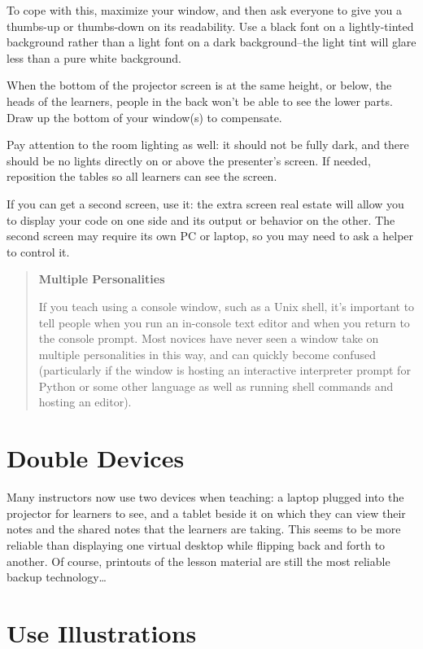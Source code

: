 \documentclass[10pt,statementpaper]{memoir}
\begin{document}
To cope with this, maximize your window, and then ask everyone to give
you a thumbs-up or thumbs-down on its readability. Use a black font on a
lightly-tinted background rather than a light font on a dark
background--the light tint will glare less than a pure white background.

When the bottom of the projector screen is at the same height, or below,
the heads of the learners, people in the back won't be able to see the
lower parts. Draw up the bottom of your window(s) to compensate.

Pay attention to the room lighting as well: it should not be fully dark,
and there should be no lights directly on or above the presenter's
screen. If needed, reposition the tables so all learners can see the
screen.

If you can get a second screen, use it: the extra screen real estate
will allow you to display your code on one side and its output or
behavior on the other. The second screen may require its own PC or
laptop, so you may need to ask a helper to control it.

\begin{quote}
\textbf{Multiple Personalities}

If you teach using a console window, such as a Unix shell, it's
important to tell people when you run an in-console text editor and when
you return to the console prompt. Most novices have never seen a window
take on multiple personalities in this way, and can quickly become
confused (particularly if the window is hosting an interactive
interpreter prompt for Python or some other language as well as running
shell commands and hosting an editor).
\end{quote}

\section{Double Devices}\label{double-devices}

Many instructors now use two devices when teaching: a laptop plugged
into the projector for learners to see, and a tablet beside it on which
they can view their notes and the shared notes that the learners are
taking. This seems to be more reliable than displaying one virtual
desktop while flipping back and forth to another. Of course, printouts
of the lesson material are still the most reliable backup
technology\ldots{}

\section{Use Illustrations}\label{use-illustrations}
\end{document}
